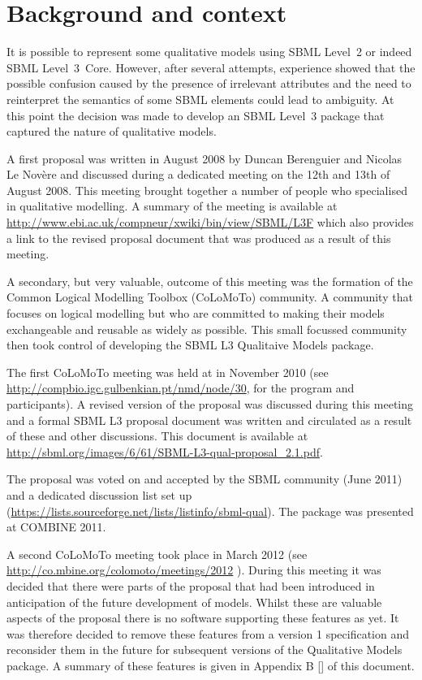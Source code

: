 
\section{Background and context}
\label{background}

It is possible to represent some qualitative models using SBML Level~2 or indeed SBML Level~3~Core. However,  after several attempts, experience showed that the possible confusion caused by the presence of irrelevant attributes and the need to reinterpret the semantics of some SBML elements could lead to ambiguity. At this point the decision was made to develop an SBML Level~3 package that captured the nature of qualitative models.


A first proposal was written in August 2008 by Duncan Berenguier and Nicolas Le Nov\`ere and discussed during a dedicated meeting on the 12th and 13th of August 2008. This meeting brought together a number of people who specialised in qualitative modelling. A summary of the meeting is available at \url{http://www.ebi.ac.uk/compneur/xwiki/bin/view/SBML/L3F} which also provides a link to the revised proposal document that was produced as a result of this meeting.

A secondary, but very valuable, outcome of this meeting was the formation of the Common Logical Modelling Toolbox (CoLoMoTo) community. A community that focuses on logical modelling but who are committed to making their models exchangeable and reusable as widely as possible.  This small focussed community then took control of developing the SBML L3 Qualitaive Models package.

The first CoLoMoTo meeting was held at in November 2010 (see \url{http://compbio.igc.gulbenkian.pt/nmd/node/30}, for the program and participants). A revised version of the proposal was discussed during this meeting and a formal SBML L3 proposal document was written and circulated as a result of these and other discussions.
This document is available at \url{http://sbml.org/images/6/61/SBML-L3-qual-proposal_2.1.pdf}.

The proposal was voted on and accepted by the SBML community (June 2011) and a dedicated discussion list set up (\url{https://lists.sourceforge.net/lists/listinfo/sbml-qual}). The package was presented at COMBINE 2011.

A second CoLoMoTo meeting took place in March 2012 (see \url{http://co.mbine.org/colomoto/meetings/2012} ). During this meeting it was decided that there were parts of the proposal that had been introduced in anticipation of the future development of models. Whilst these are valuable aspects of the proposal there is no software supporting these features as yet. It was therefore decided to remove these features from a version 1 specification and reconsider them in the future for subsequent versions of the Qualitative Models package. A summary of these features is given in Appendix B \ref{} of this document.


